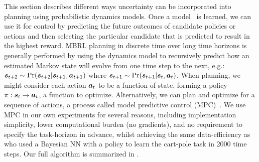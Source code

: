 This section describes different ways uncertainty can be incorporated into planning using probabilistic dynamics models.
Once a model~\smash{$\dynamicsModel_{\parameters}$} is learned, we can use it for control by predicting the future outcomes of candidate policies or actions and then selecting the particular candidate that is predicted to result in the highest reward.
MBRL planning in discrete time over long time horizons is generally performed by using the dynamics model to recursively predict how an estimated Markov state will evolve from one time step to the next, e.g.: $\boldsymbol{s}_{t + 2} \sim {\text{Pr}}(\boldsymbol{s}_{t + 2} | \boldsymbol{s}_{t + 1}, \boldsymbol{a}_{t + 1})$ where $\boldsymbol{s}_{t + 1} \sim {\text{Pr}}(\boldsymbol{s}_{t + 1} | \boldsymbol{s}_{t}, \boldsymbol{a}_{t})$.
%
When planning, we might consider each action $\boldsymbol{a}_{t}$ to be a function of state, forming a policy $\pi: \boldsymbol{s}_t \rightarrow \boldsymbol{a}_t$, a function to optimize.
Alternatively, we can plan and optimize for a sequence of actions, a process called model predictive control (MPC)~\citep{Camacho2013}.
We use MPC in our own experiments for several reasons, %
including implementation simplicity, lower computational burden (no gradients), and
no requirement to specify the task-horizon in advance, whilst achieving the same data-efficiency as \citet{Gal2016} who used a Bayesian NN with a policy to learn the cart-pole task in 2000 time steps.
Our full algorithm is summarized in .

